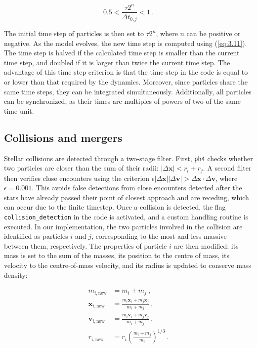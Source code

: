 \begin{equation}
	0.5 < \frac{\tau 2^{n}}{\Delta t_{0, j}} < 1~.
\end{equation}

The initial time step of particles is then set to $\tau 2^{n}$, where $n$ can be positive or negative. As the model evolves, the new time step is computed using (\ref{eq:3.11}). The time step is halved if the calculated time step is smaller than the current time step, and doubled if it is larger than twice the current time step. The advantage of this time step criterion is that the time step in the code is equal to or lower than that required by the dynamics. Moreover, since particles share the same time steps, they can be integrated simultaneously. Additionally, all particles can be synchronized, as their times are multiples of powers of two of the same time unit.

\subsection{Collisions and mergers}
\label{subsec:3.2.3_Collisions_mergers}

Stellar collisions are detected through a two-stage filter. First, \texttt{ph4} checks whether two particles are closer than the sum of their radii: $|\Delta \mathbf{x}| < r_i + r_j$. A second filter then verifies close encounters using the criterion $ \epsilon |\Delta \mathbf{x}| |\Delta \mathbf{v}| > \Delta \mathbf{x} \cdot \Delta \mathbf{v}$, where $\epsilon = 0.001$. This avoids false detections from close encounters detected after the stars have already passed their point of closest approach and are receding, which can occur due to the finite timestep. Once a collision is detected, the flag \texttt{collision\_detection} in the code is activated, and a custom handling routine is executed. In our implementation, the two particles involved in the collision are identified as particles $i$ and $j$, corresponding to the most and less massive between them, respectively. The properties of particle $i$ are then modified: its mass is set to the sum of the masses, its position to the centre of mass, its velocity to the centre-of-mass velocity, and its radius is updated to conserve mass density:

\begin{align}
	m_{i, \text{new}} &= m_i + m_j ~,\\
	\mathbf{x}_{i, \text{new}} &= \frac{m_i \mathbf{x}_{i} + m_j \mathbf{x}_{j}}{m_i + m_j} ~,\\
	\mathbf{v}_{i, \text{new}} &= \frac{m_i \mathbf{v}_{i} + m_j \mathbf{v}_{j}}{m_i + m_j} ~,\\
	r_{i, \text{new}} &= r_i \left(\frac{m_i + m_j}{m_i}\right)^{1/3}~. \\	
\end{align}

